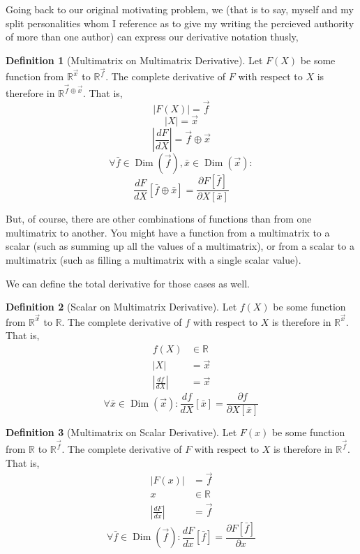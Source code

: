 \documentclass[12pt]{book}
\theoremstyle{plain}
\theoremstyle{definition}
\newtheorem{definition}{Definition}[chapter]
\theoremstyle{ppart}
\theoremstyle{case}
\theoremstyle{solution}
\DeclareMathOperator{\Dim}{Dim}
\begin{document}
Going back to our original motivating problem, we (that is to say, myself and my
split personalities whom I reference as to give my writing the percieved authority
of more than one author) can express our derivative notation thusly,

\begin{definition}[Multimatrix on Multimatrix Derivative]
\label{mm_derivative}
Let $F(X)$ be some function from $\mathbb{R}^{\vec{x}}$ to $\mathbb{R}^{\vec{f}}$.
The complete derivative of $F$ with respect to $X$ is therefore in
$\mathbb{R}^{\vec{f} \oplus \vec{x}}$. That is,
\[ |F(X)| = \vec{f} \]
\[ |X| = \vec{x} \]
\[ \left|\frac{dF}{dX}\right| = \vec{f} \oplus \vec{x} \]
\[
\forall \bar{f} \in \Dim(\vec{f}),
        \bar{x} \in \Dim(\vec{x}):
\]
\[
\frac{dF}{dX}[\bar{f} \oplus \bar{x}] =
\frac{\partial F[\bar{f}]}{\partial X[\bar{x}]}
\]
\end{definition}

But, of course, there are other combinations of functions than from one
multimatrix to another. You might have a function from a multimatrix to a
scalar (such as summing up all the values of a multimatrix), or from a scalar
to a multimatrix (such as filling a multimatrix with a single scalar value).

We can define the total derivative for those cases as well.

\begin{definition}[Scalar on Multimatrix Derivative]
\label{sm_derivative}
Let $f(X)$ be some function from $\mathbb{R}^{\vec{x}}$ to $\mathbb{R}$.
The complete derivative of $f$ with respect to $X$ is therefore in
$\mathbb{R}^{\vec{x}}$. That is,
\begin{align*}
f(X) &\in \mathbb{R} \\
|X| &= \vec{x} \\
\left|\frac{df}{dX}\right| &= \vec{x}
\end{align*}
\[
\forall \bar{x} \in \Dim(\vec{x}):
        \frac{df}{dX}[\bar{x}] =
        \frac{\partial f}{\partial X[\bar{x}]}
\]
\end{definition}

\begin{definition}[Multimatrix on Scalar Derivative]
\label{ms_derivative}
Let $F(x)$ be some function from $\mathbb{R}$ to $\mathbb{R}^{\vec{f}}$.
The complete derivative of $F$ with respect to $X$ is therefore in
$\mathbb{R}^{\vec{f}}$. That is,
\begin{align*}
|F(x)| &= \vec{f} \\
x &\in \mathbb{R} \\
\left|\frac{dF}{dx}\right| &= \vec{f}
\end{align*}
\[
\forall \bar{f} \in \Dim(\vec{f}):
        \frac{dF}{dx}[\bar{f}] =
        \frac{\partial F[\bar{f}]}{\partial x}
\]
\end{definition}
\end{document}
